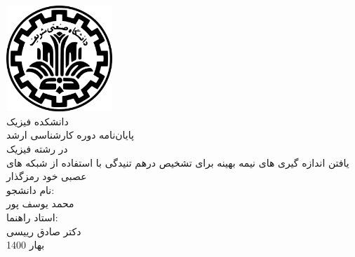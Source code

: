 \pagestyle{empty}
\begin{center}
\includegraphics[width=0.3\textwidth]{logo.png}\\
\Nastaliq
\large{دانشکده فیزیک}\\\vspace{1cm}
\titlefont
\large{ پایان‌نامه دوره کارشناسی ارشد}\\
\large{در رشته فیزیک}\\
\vspace{1cm}
\Large{یافتن اندازه گیری های نیمه بهینه برای تشخیص درهم تنیدگی با استفاده از شبکه های عصبی خود رمزگذار}\\\vspace{2cm}
\normalsize{نام دانشجو:}\\
\large{محمد یوسف پور}\\\vspace{2cm}
\normalsize{استاد راهنما:}\\
\large{دکتر صادق رییسی}\\\vspace{2cm}
\normalsize{بهار 1400}

\end{center}
\newpage\null\newpage
